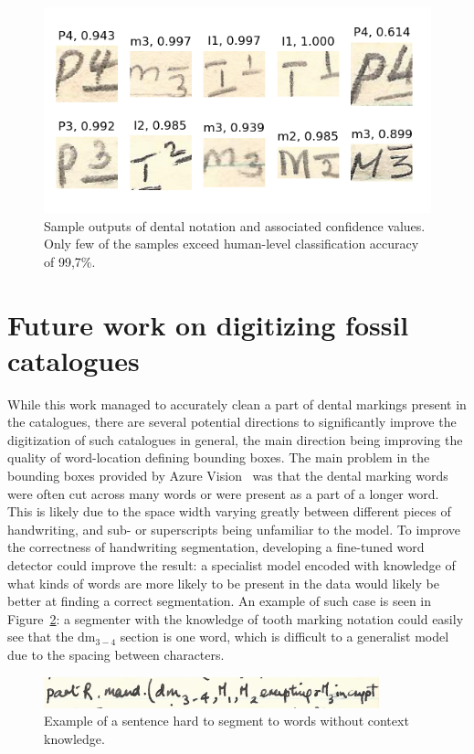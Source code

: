 \documentclass[english,twoside,openright]{UH_DS_MSc}
\begin{document}
\begin{figure}[ht]
    \centering
    \includegraphics*[scale=0.8]{images/inference.png}
    \caption{Sample outputs of dental notation and associated confidence values. Only few of the samples exceed human-level classification accuracy of 99,7\%.}
    \label{image:inference}
\end{figure}

\section{Future work on digitizing fossil catalogues}

While this work managed to accurately clean a part of dental markings present in the catalogues, 
there are several potential directions to significantly improve the digitization of such catalogues in general, the main direction 
being improving the quality of word-location defining bounding boxes. The main problem in the bounding boxes provided 
by Azure Vision~\cite{azurevision} was that the dental marking words were often cut across many words or were present 
as a part of a longer word. This is likely due to the space width varying greatly between different pieces of 
handwriting, and sub- or superscripts being unfamiliar to the model. To improve the correctness of handwriting segmentation, developing a fine-tuned word detector 
could improve the result: a specialist model encoded with knowledge of what kinds of words are more likely to be 
present in the data would likely be better at finding a correct segmentation. An example of 
such case is seen in Figure~\ref{image:hardsentence}: a segmenter with the knowledge of tooth marking notation could 
easily see that the $\text{dm}_{3-4}$ section is one word, which is difficult to a generalist model 
due to the spacing between characters.

\begin{figure}[ht]
    \centering
    \includegraphics*[scale=0.8]{images/hardwordsegmentation.png}
    \caption{Example of a sentence hard to segment to words without context knowledge.}
    \label{image:hardsentence}
\end{figure}
\end{document}
